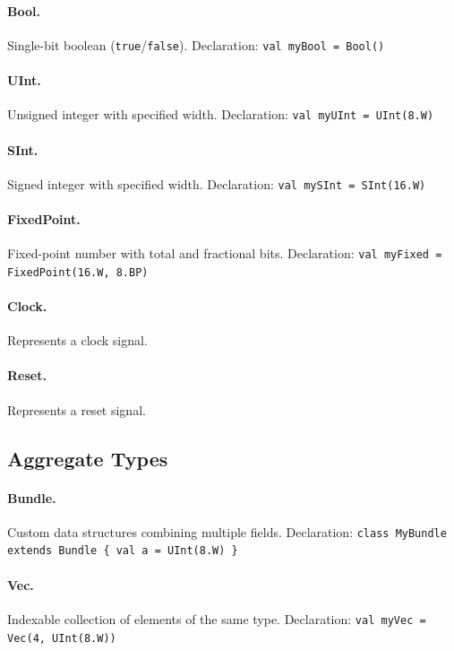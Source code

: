\paragraph{Bool.} Single-bit boolean (\texttt{true}/\texttt{false}). Declaration: \texttt{val myBool = Bool()}

\paragraph{UInt.} Unsigned integer with specified width. Declaration: \texttt{val myUInt = UInt(8.W)}

\paragraph{SInt.} Signed integer with specified width. Declaration: \texttt{val mySInt = SInt(16.W)}

\paragraph{FixedPoint.} Fixed-point number with total and fractional bits. Declaration: \texttt{val myFixed = FixedPoint(16.W, 8.BP)}

\paragraph{Clock.} Represents a clock signal.

\paragraph{Reset.} Represents a reset signal.

\subsection{Aggregate Types}
\paragraph{Bundle.} Custom data structures combining multiple fields. Declaration: \texttt{class MyBundle extends Bundle \{ val a = UInt(8.W) \}}

\paragraph{Vec.} Indexable collection of elements of the same type. Declaration: \texttt{val myVec = Vec(4, UInt(8.W))}

